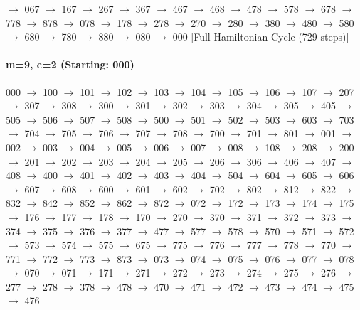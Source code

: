 $\rightarrow$ 067 $\rightarrow$ 167 $\rightarrow$ 267 $\rightarrow$ 367 $\rightarrow$ 467 $\rightarrow$ 468 $\rightarrow$ 478 $\rightarrow$ 578 $\rightarrow$ 678 $\rightarrow$ 778 $\rightarrow$ 878 $\rightarrow$ 078 $\rightarrow$ 178 $\rightarrow$ 278 $\rightarrow$ 270 $\rightarrow$ 280 $\rightarrow$ 380 $\rightarrow$ 480 $\rightarrow$ 580 $\rightarrow$ 680 $\rightarrow$ 780 $\rightarrow$ 880 $\rightarrow$ 080 $\rightarrow$ 000 [Full Hamiltonian Cycle (729 steps)]

\paragraph{m=9, c=2 (Starting: 000)}


000 $\rightarrow$ 100 $\rightarrow$ 101 $\rightarrow$ 102 $\rightarrow$ 103 $\rightarrow$ 104 $\rightarrow$ 105 $\rightarrow$ 106 $\rightarrow$ 107 $\rightarrow$ 207 $\rightarrow$ 307 $\rightarrow$ 308 $\rightarrow$ 300 $\rightarrow$ 301 $\rightarrow$ 302 $\rightarrow$ 303 $\rightarrow$ 304 $\rightarrow$ 305 $\rightarrow$ 405 $\rightarrow$ 505 $\rightarrow$ 506 $\rightarrow$ 507 $\rightarrow$ 508 $\rightarrow$ 500 $\rightarrow$ 501 $\rightarrow$ 502 $\rightarrow$ 503 $\rightarrow$ 603 $\rightarrow$ 703 $\rightarrow$ 704 $\rightarrow$ 705 $\rightarrow$ 706 $\rightarrow$ 707 $\rightarrow$ 708 $\rightarrow$ 700 $\rightarrow$ 701 $\rightarrow$ 801 $\rightarrow$ 001 $\rightarrow$ 002 $\rightarrow$ 003 $\rightarrow$ 004 $\rightarrow$ 005 $\rightarrow$ 006 $\rightarrow$ 007 $\rightarrow$ 008 $\rightarrow$ 108 $\rightarrow$ 208 $\rightarrow$ 200 $\rightarrow$ 201 $\rightarrow$ 202 $\rightarrow$ 203 $\rightarrow$ 204 $\rightarrow$ 205 $\rightarrow$ 206 $\rightarrow$ 306 $\rightarrow$ 406 $\rightarrow$ 407 $\rightarrow$ 408 $\rightarrow$ 400 $\rightarrow$ 401 $\rightarrow$ 402 $\rightarrow$ 403 $\rightarrow$ 404 $\rightarrow$ 504 $\rightarrow$ 604 $\rightarrow$ 605 $\rightarrow$ 606 $\rightarrow$ 607 $\rightarrow$ 608 $\rightarrow$ 600 $\rightarrow$ 601 $\rightarrow$ 602 $\rightarrow$ 702 $\rightarrow$ 802 $\rightarrow$ 812 $\rightarrow$ 822 $\rightarrow$ 832 $\rightarrow$ 842 $\rightarrow$ 852 $\rightarrow$ 862 $\rightarrow$ 872 $\rightarrow$ 072 $\rightarrow$ 172 $\rightarrow$ 173 $\rightarrow$ 174 $\rightarrow$ 175 $\rightarrow$ 176 $\rightarrow$ 177 $\rightarrow$ 178 $\rightarrow$ 170 $\rightarrow$ 270 $\rightarrow$ 370 $\rightarrow$ 371 $\rightarrow$ 372 $\rightarrow$ 373 $\rightarrow$ 374 $\rightarrow$ 375 $\rightarrow$ 376 $\rightarrow$ 377 $\rightarrow$ 477 $\rightarrow$ 577 $\rightarrow$ 578 $\rightarrow$ 570 $\rightarrow$ 571 $\rightarrow$ 572 $\rightarrow$ 573 $\rightarrow$ 574 $\rightarrow$ 575 $\rightarrow$ 675 $\rightarrow$ 775 $\rightarrow$ 776 $\rightarrow$ 777 $\rightarrow$ 778 $\rightarrow$ 770 $\rightarrow$ 771 $\rightarrow$ 772 $\rightarrow$ 773 $\rightarrow$ 873 $\rightarrow$ 073 $\rightarrow$ 074 $\rightarrow$ 075 $\rightarrow$ 076 $\rightarrow$ 077 $\rightarrow$ 078 $\rightarrow$ 070 $\rightarrow$ 071 $\rightarrow$ 171 $\rightarrow$ 271 $\rightarrow$ 272 $\rightarrow$ 273 $\rightarrow$ 274 $\rightarrow$ 275 $\rightarrow$ 276 $\rightarrow$ 277 $\rightarrow$ 278 $\rightarrow$ 378 $\rightarrow$ 478 $\rightarrow$ 470 $\rightarrow$ 471 $\rightarrow$ 472 $\rightarrow$ 473 $\rightarrow$ 474 $\rightarrow$ 475 $\rightarrow$ 476 